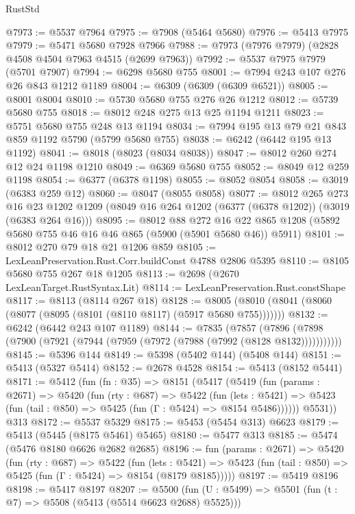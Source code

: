 \begin{lexlean}{RustStd}
\begin{coremodule}
@7973 := @5537 @7964
@7975 := @7908 (@5464 @5680)
@7976 := @5413 @7975
@7979 := @5471 @5680 @7928 @7966
@7988 := @7973 (@7976 @7979) (@2828 @4508 @4504 @7963 @4515 (@2699 @7963))
@7992 := @5537 @7975 @7979 (@5701 @7907)
@7994 := @6298 @5680 @755
@8001 := @7994 @243 @107 @276 @26 @843 @1212 @1189
@8004 := @6309 (@6309 (@6309 @6521))
@8005 := @8001 @8004
@8010 := @5730 @5680 @755 @276 @26 @1212
@8012 := @5739 @5680 @755
@8018 := @8012 @248 @275 @13 @25 @1194 @1211
@8023 := @5751 @5680 @755 @248 @13 @1194
@8034 := @7994 @195 @13 @79 @21 @843 @859 @1192 @5790 (@5799 @5680 @755)
@8038 := @6242 (@6442 @195 @13 @1192)
@8041 := @8018 (@8023 (@8034 @8038))
@8047 := @8012 @260 @274 @12 @24 @1198 @1210
@8049 := @6369 @5680 @755
@8052 := @8049 @12 @259 @1198
@8054 := @6377 (@6378 @1198)
@8055 := @8052 @8054
@8058 := @3019 (@6383 @259 @12)
@8060 := @8047 (@8055 @8058)
@8077 := @8012
    @265
    @273
    @16
    @23
    @1202
    @1209
    (@8049 @16 @264 @1202 (@6377 (@6378 @1202)) (@3019 (@6383 @264 @16)))
@8095 := @8012
    @88
    @272
    @16
    @22
    @865
    @1208
    (@5892 @5680 @755 @46 @16 @46 @865 (@5900 (@5901 @5680 @46)) @5911)
@8101 := @8012 @270 @79 @18 @21 @1206 @859
@8105 := LexLeanPreservation.Rust.Corr.buildConst @4788 @2806 @5395
@8110 := @8105 @5680 @755 @267 @18 @1205
@8113 := @2698 (@2670 LexLeanTarget.RustSyntax.Lit)
@8114 := LexLeanPreservation.Rust.constShape
@8117 := @8113 (@8114 @267 @18)
@8128 := @8005 (@8010 (@8041 (@8060 (@8077 (@8095 (@8101 (@8110 @8117) (@5917 @5680 @755)))))))
@8132 := @6242 (@6442 @243 @107 @1189)
@8144 := @7835
    (@7857 (@7896 (@7898 (@7900 (@7921 (@7944 (@7959 (@7972 (@7988 (@7992 (@8128 @8132)))))))))))
@8145 := @5396 @144
@8149 := @5398 (@5402 @144) (@5408 @144)
@8151 := @5413 (@5327 @5414)
@8152 := @2678 @4528
@8154 := @5413 (@8152 @5441)
@8171 := @5412
    (fun (fn : @35) =>
    @8151
      (@5417
        (@5419
          (fun (params : @2671) =>
          @5420
            (fun (rty : @687) =>
            @5422
              (fun (lets : @5421) =>
              @5423 (fun (tail : @850) => @5425 (fun (Γ : @5424) => @8154 @5486))))))
        @5531))
    @313
@8172 := @5537 @5329
@8175 := @5453 (@5454 @313) @6623
@8179 := @5413 (@5445 (@8175 @5461) @5465)
@8180 := @5477 @313
@8185 := @5474 (@5476 @8180 @6626 @2682 @2685)
@8196 := fun (params : @2671) =>
  @5420
    (fun (rty : @687) =>
    @5422
      (fun (lets : @5421) =>
      @5423 (fun (tail : @850) => @5425 (fun (Γ : @5424) => @8154 (@8179 @8185)))))
@8197 := @5419 @8196
@8198 := @5417 @8197
@8207 := @5500 (fun (U : @5499) => @5501 (fun (t : @7) => @5508 (@5413 (@5514 @6623 @2688) @5525)))

\end{coremodule}
\end{lexlean}
